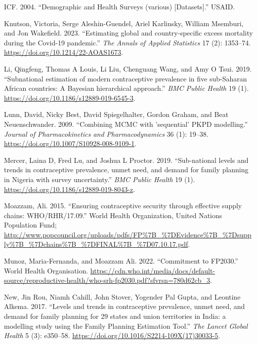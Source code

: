 \begin{CSLReferences}{1}{0}
\leavevmode{}%
ICF. 2004. {``{Demographic and Health Surveys (various) {[}Datasets{]}}.''} USAID.

\leavevmode{}%
Knutson, Victoria, Serge Aleshin-Guendel, Ariel Karlinsky, William Msemburi, and Jon Wakefield. 2023. {``{Estimating global and country-specific excess mortality during the Covid-19 pandemic}.''} \emph{The Annals of Applied Statistics} 17 (2): 1353--74. \url{https://doi.org/10.1214/22-AOAS1673}.

\leavevmode{}%
Li, Qingfeng, Thomas A Louis, Li Liu, Chenguang Wang, and Amy O Tsui. 2019. {``{Subnational estimation of modern contraceptive prevalence in five sub-Saharan African countries: A Bayesian hierarchical approach}.''} \emph{BMC Public Health} 19 (1). \url{https://doi.org/10.1186/s12889-019-6545-3}.

\leavevmode{}%
Lunn, David, Nicky Best, David Spiegelhalter, Gordon Graham, and Beat Neuenschwander. 2009. {``{Combining MCMC with 'sequential' PKPD modelling}.''} \emph{Journal of Pharmacokinetics and Pharmacodynamics} 36 (1): 19--38. \url{https://doi.org/10.1007/S10928-008-9109-1}.

\leavevmode{}%
Mercer, Laina D, Fred Lu, and Joshua L Proctor. 2019. {``{Sub-national levels and trends in contraceptive prevalence, unmet need, and demand for family planning in Nigeria with survey uncertainty}.''} \emph{BMC Public Health} 19 (1). \url{https://doi.org/10.1186/s12889-019-8043-z}.

\leavevmode{}%
Moazzam, Ali. 2015. {``{Ensuring contraceptive security through effective supply chains: WHO/RHR/17.09}.''} World Health Organization, United Nations Population Fund; \url{http://www.popcouncil.org/uploads/pdfs/FP\%7B_\%7DEvidence\%7B_\%7Dsupply\%7B_\%7Dchains\%7B_\%7DFINAL\%7B_\%7D07.10.17.pdf}.

\leavevmode{}%
Munoz, Maria-Fernanda, and Moazzam Ali. 2022. {``Commitment to FP2030.''} World Health Organisation. \url{https://cdn.who.int/media/docs/default-source/reproductive-health/who-srh-fp2030.pdf?sfvrsn=780d62cb_3}.

\leavevmode{}%
New, Jin Rou, Niamh Cahill, John Stover, Yogender Pal Gupta, and Leontine Alkema. 2017. {``{Levels and trends in contraceptive prevalence, unmet need, and demand for family planning for 29 states and union territories in India: a modelling study using the Family Planning Estimation Tool}.''} \emph{The Lancet Global Health} 5 (3): e350--58. \url{https://doi.org/10.1016/S2214-109X(17)30033-5}.


\end{CSLReferences}
